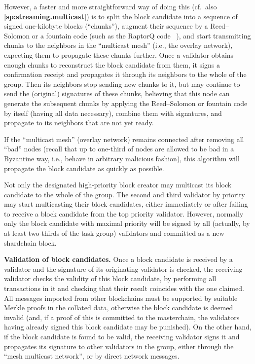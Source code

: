 \documentclass[12pt,oneside]{article}
\def\makepoint#1{\medbreak\noindent{\bf #1.\ }}
\def\nxsubpoint{\refstepcounter{subsubsection}%
  \smallbreak\makepoint{\thesubsubsection}}
\def\refpoint#1{{\rm\textbf{\ref{#1}}}}
\let\ptref=\refpoint
\def\embt(#1.){\textbf{#1.}}
\begin{document}
However, a faster and more straightforward way of doing this
(cf.\ also \ptref{sp:streaming.multicast}) is to split the block
candidate into a sequence of signed one-kilobyte blocks (``chunks''),
augment their sequence by a Reed--Solomon or a fountain code (such as
the RaptorQ code~\cite{RaptorQ} \cite{Raptor}), and start transmitting
chunks to the neighbors in the ``multicast mesh'' (i.e., the overlay
network), expecting them to propagate these chunks further. Once a
validator obtains enough chunks to reconstruct the block candidate
from them, it signs a confirmation receipt and propagates it through
its neighbors to the whole of the group. Then its neighbors stop
sending new chunks to it, but may continue to send the (original)
signatures of these chunks, believing that this node can generate the
subsequent chunks by applying the Reed--Solomon or fountain code by
itself (having all data necessary), combine them with signatures, and
propagate to its neighbors that are not yet ready.

If the ``multicast mesh'' (overlay network) remains connected after
removing all ``bad'' nodes (recall that up to one-third of nodes are
allowed to be bad in a Byzantine way, i.e., behave in arbitrary
malicious fashion), this algorithm will propagate the block candidate
as quickly as possible.

Not only the designated high-priority block creator may multicast its
block candidate to the whole of the group. The second and third
validator by priority may start multicasting their block candidates,
either immediately or after failing to receive a block candidate from
the top priority validator. However, normally only the block candidate
with maximal priority will be signed by all (actually, by at least
two-thirds of the task group) validators and committed as a new
shardchain block.

\nxsubpoint \embt(Validation of block candidates.)  Once a block
candidate is received by a validator and the signature of its
originating validator is checked, the receiving validator checks the
validity of this block candidate, by performing all transactions in it
and checking that their result coincides with the one claimed. All
messages imported from other blockchains must be supported by suitable
Merkle proofs in the collated data, otherwise the block candidate is
deemed invalid (and, if a proof of this is committed to the
masterchain, the validators having already signed this block candidate
may be punished). On the other hand, if the block candidate is found
to be valid, the receiving validator signs it and propagates its
signature to other validators in the group, either through the ``mesh
multicast network'', or by direct network messages.
\end{document}
